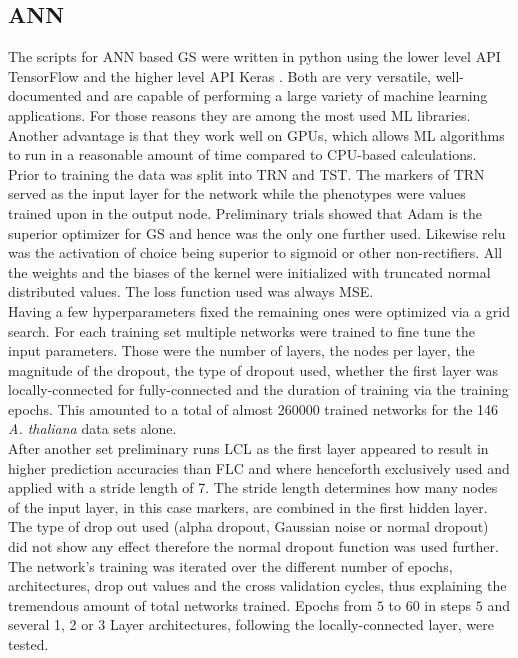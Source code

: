 \subsection{ANN}
The scripts for ANN based GS were written in python using the lower level API TensorFlow
\cite{TF2016} and the higher level API Keras \cite{keras2015}. Both are very versatile,
well-documented and are capable of performing a large variety of machine learning
applications. For those reasons they are among the most used ML libraries. Another
advantage is that they work well on GPUs, which allows ML algorithms to run in a
reasonable amount of time compared to CPU-based calculations. \\
Prior to training the data was split into TRN and TST. The markers of TRN served as the
input layer for the network while the phenotypes were values trained upon in the output
node. Preliminary trials showed that Adam is the superior optimizer for GS and hence was
the only one further used. Likewise relu was the activation of choice being superior to
sigmoid or other non-rectifiers. All the weights and the biases of the kernel were
initialized with truncated normal distributed
values. The loss function used was always MSE. \\
Having a few hyperparameters fixed the remaining ones were optimized via a grid
search. For each training set multiple networks were trained to fine tune the input
parameters. Those were the number of layers, the nodes per layer, the magnitude of the
dropout, the type of dropout used, whether the first layer was locally-connected for
fully-connected and the duration of training via the training epochs. This amounted to a
total of almost 260000 trained networks for the 146 \textit{A. thaliana} data sets alone. \\
After another set preliminary runs LCL as the first layer appeared to result in higher
prediction accuracies than FLC and where henceforth exclusively used and applied with a
stride length of 7. The stride length determines how many nodes of the input layer, in
this case markers, are combined in the first hidden layer. The type of drop out used
(alpha dropout, Gaussian noise or normal dropout) did not show any effect therefore the
normal dropout function was used further. The network's training was iterated over the
different number of epochs, architectures, drop out values and the cross validation
cycles, thus explaining the tremendous amount of total networks trained. Epochs from $5$
to $60$ in steps $5$ and several 1, 2 or 3 Layer architectures, following the
locally-connected layer, were tested.

